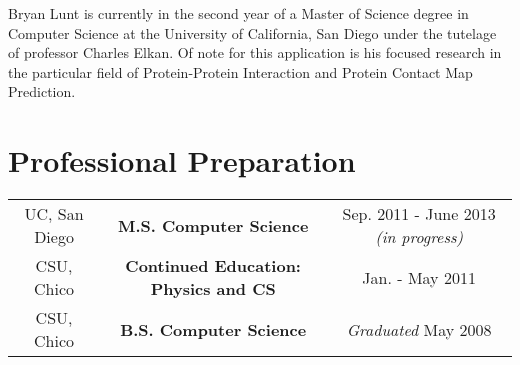 

%

Bryan Lunt is currently in the second year of a Master of Science degree in Computer Science at the University of California, San Diego under the tutelage of professor Charles Elkan.
Of note for this application is his focused research in the particular field of Protein-Protein Interaction and Protein Contact Map Prediction.

\nocite{Morcos2011a,Procaccini2011a,Lunt2010a}
\nocite{LUNT201017,Lunt393835}
\section*{Professional Preparation}
\begin{tabular}{c c c}
UC, San Diego & {\bf M.S. Computer Science} & Sep. 2011 - June 2013 {\it (in progress)}\\
CSU, Chico & {\bf Continued Education: Physics and CS} & Jan. - May 2011\\
CSU, Chico & {\bf B.S. Computer Science}  & {\it Graduated} May 2008\\
\end{tabular}

